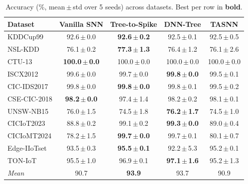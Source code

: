 \begin{table}[t]
\centering
\caption{Accuracy (\%, mean\,$\pm$\,std over 5 seeds) across datasets. Best per row in \textbf{bold}.}
\label{tab:accuracy}
\footnotesize
\setlength{\tabcolsep}{4pt}
\begin{tabular}{lcccc}
\toprule
Dataset & Vanilla SNN & Tree-to-Spike & DNN-Tree & TASNN \\
\midrule
KDDCup99 & 92.6\,$\pm$\,0.0 & \textbf{92.6\,$\pm$\,0.2} & 92.5\,$\pm$\,0.1 & 92.5\,$\pm$\,0.5 \\
NSL-KDD & 76.1\,$\pm$\,0.2 & \textbf{77.3\,$\pm$\,1.3} & 76.4\,$\pm$\,1.2 & 76.1\,$\pm$\,2.6 \\
CTU-13 & \textbf{100.0\,$\pm$\,0.0} & 100.0\,$\pm$\,0.0 & 100.0\,$\pm$\,0.0 & 100.0\,$\pm$\,0.0 \\
ISCX2012 & 99.6\,$\pm$\,0.0 & 99.7\,$\pm$\,0.0 & \textbf{99.8\,$\pm$\,0.0} & 99.5\,$\pm$\,0.1 \\
CIC-IDS2017 & 99.8\,$\pm$\,0.0 & \textbf{99.8\,$\pm$\,0.0} & 99.8\,$\pm$\,0.1 & 99.5\,$\pm$\,0.2 \\
CSE-CIC-2018 & \textbf{98.2\,$\pm$\,0.0} & 97.4\,$\pm$\,1.4 & 98.2\,$\pm$\,0.2 & 98.1\,$\pm$\,0.1 \\
UNSW-NB15 & 76.0\,$\pm$\,1.5 & 74.5\,$\pm$\,1.8 & \textbf{76.2\,$\pm$\,1.7} & 74.5\,$\pm$\,1.0 \\
CICIoT2023 & 88.8\,$\pm$\,0.2 & 99.1\,$\pm$\,0.2 & \textbf{99.3\,$\pm$\,0.0} & 89.0\,$\pm$\,0.4 \\
CICIoMT2024 & 78.2\,$\pm$\,1.5 & \textbf{99.7\,$\pm$\,0.0} & 99.7\,$\pm$\,0.1 & 80.1\,$\pm$\,0.7 \\
Edge-IIoTset & 93.5\,$\pm$\,0.3 & \textbf{95.5\,$\pm$\,0.1} & 92.2\,$\pm$\,5.3 & 95.2\,$\pm$\,0.1 \\
TON-IoT & 95.5\,$\pm$\,1.0 & 96.9\,$\pm$\,0.1 & \textbf{97.1\,$\pm$\,1.6} & 95.2\,$\pm$\,1.3 \\
\midrule
\textit{Mean} & 90.7 & \textbf{93.9} & 93.7 & 90.9 \\
\bottomrule
\end{tabular}
\end{table}
